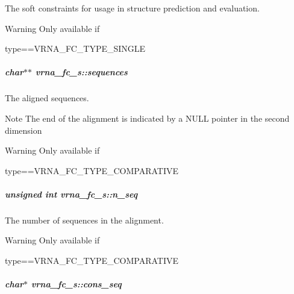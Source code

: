 The soft constraints for usage in structure prediction and evaluation. 

\begin{DoxyWarning}{Warning}
Only available if\begin{DoxyVerb}type==VRNA_FC_TYPE_SINGLE \end{DoxyVerb}
 
\end{DoxyWarning}
\subparagraph[{\texorpdfstring{sequences}{sequences}}]{\setlength{\rightskip}{0pt plus 5cm}char$\ast$$\ast$ vrna\+\_\+fc\+\_\+s\+::sequences}\hypertarget{group__fold__compound_a965dbb42f2e13cace5aa3bbab4396530}{}\label{group__fold__compound_a965dbb42f2e13cace5aa3bbab4396530}


The aligned sequences. 

\begin{DoxyNote}{Note}
The end of the alignment is indicated by a N\+U\+LL pointer in the second dimension 
\end{DoxyNote}
\begin{DoxyWarning}{Warning}
Only available if\begin{DoxyVerb}type==VRNA_FC_TYPE_COMPARATIVE \end{DoxyVerb}
 
\end{DoxyWarning}
\subparagraph[{\texorpdfstring{n\+\_\+seq}{n_seq}}]{\setlength{\rightskip}{0pt plus 5cm}unsigned int vrna\+\_\+fc\+\_\+s\+::n\+\_\+seq}\hypertarget{group__fold__compound_a614702ab74478e786272be44f8cebfe3}{}\label{group__fold__compound_a614702ab74478e786272be44f8cebfe3}


The number of sequences in the alignment. 

\begin{DoxyWarning}{Warning}
Only available if\begin{DoxyVerb}type==VRNA_FC_TYPE_COMPARATIVE \end{DoxyVerb}
 
\end{DoxyWarning}
\subparagraph[{\texorpdfstring{cons\+\_\+seq}{cons_seq}}]{\setlength{\rightskip}{0pt plus 5cm}char$\ast$ vrna\+\_\+fc\+\_\+s\+::cons\+\_\+seq}\hypertarget{group__fold__compound_ac472afde64d8b3c8b84e4809fda7d814}{}\label{group__fold__compound_ac472afde64d8b3c8b84e4809fda7d814}


